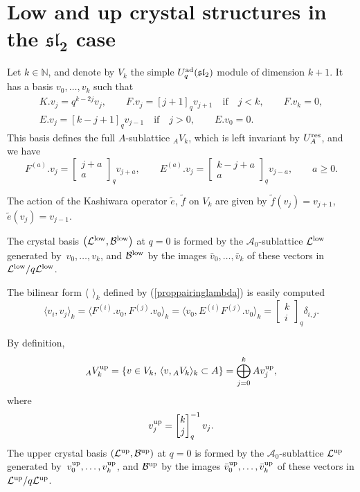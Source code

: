 \documentclass[pdftex]{sigma}
\numberwithin{equation}{section}
\theoremstyle{definition}
\newcommand{\Aa}{{\mathcal A}}
\begin{document}
\appendix
\section[Low and up crystal structures in the sl\_2 case]{Low and up crystal structures in the $\boldsymbol{{\mathfrak{sl}_2}}$ case}\label{lowupbases}
Let $k\in {\mathbb N}$, and denote by $V_k$ the simple $U_q^{\rm ad}({\mathfrak{sl}_2})$ module of dimension $k+1$. It has a basis $v_0,\dots, v_k$ such that
\begin{gather*}%
K.v_j=q^{k-2j}v_j,\qquad
F.v_j=[j+1]_qv_{j+1}\quad \mathrm{if}\quad j<k,\qquad F.v_k=0,\\
 E.v_j=[k-j+1]_q v_{j-1}\quad \mathrm{if}\quad j>0,\qquad E.v_0=0.
\end{gather*}
This basis defines the full $A$-sublattice
${}_AV_k$, which is left invariant by $U_A^{\rm res}$, and we have
\[ F^{(a)}.v_j=\left[\begin{matrix} j+a \\ a \end{matrix}\right]_{q} v_{j+a},\qquad E^{(a)}.v_j=\left[\begin{matrix} k-j+a \\ a \end{matrix}\right]_{q} v_{j-a}, \qquad a\geq 0.
\]

The action of the Kashiwara operator $\tilde{e}$, $\tilde{f}$ on $V_k$ are given by $\tilde{f}(v_j)=v_{j+1}$, $\tilde{e}(v_j)=v_{j-1}$.

The crystal basis $\big({\mathcal L}^{\rm low}, {\mathcal B}^{\rm low}\big)$ at $q=0$ is formed by the $\Aa_0$-sublattice ${\mathcal L}^{\rm low}$ generated by~${v_0,\dots ,v_k}$, and ${\mathcal B}^{\rm low}$ by the images $\bar{v}_0,\dots ,\bar{v}_k $ of these vectors in ${\mathcal L}^{\rm low}/q {\mathcal L}^{\rm low}$.

The bilinear form $\langle\,\ \rangle_k$ defined by (\ref{proppairinglambda}) is easily computed
\[
\langle v_i, v_j\rangle_k =\big\langle F^{(i)}.v_0, F^{(j)}.v_0\big\rangle_k= \big\langle v_0, E^{(i)}F^{(j)}.v_0\big\rangle_k=
\left[\begin{matrix} k\\ i \end{matrix}\right]_{q}\delta_{i,j}.
\]

By definition,
\[
{}_AV_k^{\rm up}=\{v \in V_k,\, \langle v, {}_AV_k\rangle_k\subset A\}=\bigoplus_{j=0}^k A v_j^{\rm up},
\]
where
\[v_j^{\rm up}=\left[\begin{matrix} k\\ j \end{matrix}\right]_{q}^{-1} v_j.\]
The upper crystal basis $({\mathcal L}^{\rm up}, {\mathcal B}^{\rm up})$ at $q=0$ is formed by the $\Aa_0$-sublattice ${\mathcal L}^{\rm up}$ generated by~${v_0^{\rm up},\dots ,v_k^{\rm up}}$, and ${\mathcal B}^{\rm up}$ by the images $\bar{v}_0^{\rm up},\dots ,\bar{v}_k^{\rm up} $ of these vectors in ${\mathcal L}^{\rm up}/q {\mathcal L}^{\rm up}$.
\end{document}
